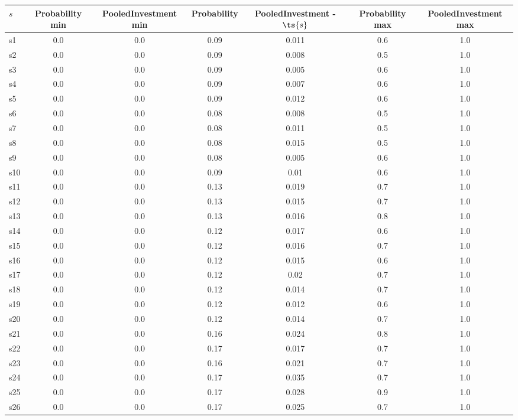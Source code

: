 \documentclass{article}
\begin{document}
\noindent\begin{tabular}{|l|c|c|c|c|c|c|}
\hline
$s$& Probability min & PooledInvestment min & Probability & PooledInvestment - $\ts{s}$ & Probability max & PooledInvestment max\\
\hline
s1 &0.0 & 0.0 & 0.09 & 0.011 & 0.6 & 1.0\\
\hline
s2 &0.0 & 0.0 & 0.09 & 0.008 & 0.5 & 1.0\\
\hline
s3 &0.0 & 0.0 & 0.09 & 0.005 & 0.6 & 1.0\\
\hline
s4 &0.0 & 0.0 & 0.09 & 0.007 & 0.6 & 1.0\\
\hline
s5 &0.0 & 0.0 & 0.09 & 0.012 & 0.6 & 1.0\\
\hline
s6 &0.0 & 0.0 & 0.08 & 0.008 & 0.5 & 1.0\\
\hline
s7 &0.0 & 0.0 & 0.08 & 0.011 & 0.5 & 1.0\\
\hline
s8 &0.0 & 0.0 & 0.08 & 0.015 & 0.5 & 1.0\\
\hline
s9 &0.0 & 0.0 & 0.08 & 0.005 & 0.6 & 1.0\\
\hline
s10 &0.0 & 0.0 & 0.09 & 0.01 & 0.6 & 1.0\\
\hline
s11 &0.0 & 0.0 & 0.13 & 0.019 & 0.7 & 1.0\\
\hline
s12 &0.0 & 0.0 & 0.13 & 0.015 & 0.7 & 1.0\\
\hline
s13 &0.0 & 0.0 & 0.13 & 0.016 & 0.8 & 1.0\\
\hline
s14 &0.0 & 0.0 & 0.12 & 0.017 & 0.6 & 1.0\\
\hline
s15 &0.0 & 0.0 & 0.12 & 0.016 & 0.7 & 1.0\\
\hline
s16 &0.0 & 0.0 & 0.12 & 0.015 & 0.6 & 1.0\\
\hline
s17 &0.0 & 0.0 & 0.12 & 0.02 & 0.7 & 1.0\\
\hline
s18 &0.0 & 0.0 & 0.12 & 0.014 & 0.7 & 1.0\\
\hline
s19 &0.0 & 0.0 & 0.12 & 0.012 & 0.6 & 1.0\\
\hline
s20 &0.0 & 0.0 & 0.12 & 0.014 & 0.7 & 1.0\\
\hline
s21 &0.0 & 0.0 & 0.16 & 0.024 & 0.8 & 1.0\\
\hline
s22 &0.0 & 0.0 & 0.17 & 0.017 & 0.7 & 1.0\\
\hline
s23 &0.0 & 0.0 & 0.16 & 0.021 & 0.7 & 1.0\\
\hline
s24 &0.0 & 0.0 & 0.17 & 0.035 & 0.7 & 1.0\\
\hline
s25 &0.0 & 0.0 & 0.17 & 0.028 & 0.9 & 1.0\\
\hline
s26 &0.0 & 0.0 & 0.17 & 0.025 & 0.7 & 1.0\\

\end{tabular}
\end{document}
